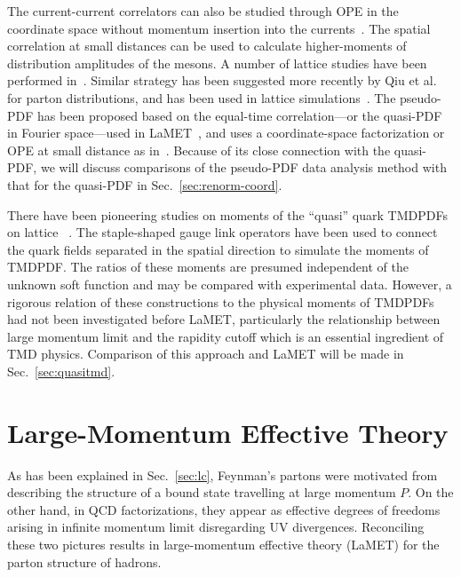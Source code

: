 \documentclass[aps,rmp,reprint,amsmath,amssymb,graphicx,longbibliography]{revtex4-1} %
\DeclareRobustCommand{\sec}[1]{Sec.~\ref{sec:#1}}
\begin{document}
The current-current correlators can also be studied through OPE
in the coordinate space without momentum insertion into the
currents~\cite{Braun:2007wv}. The spatial correlation at small distances
can be used to calculate higher-moments of distribution amplitudes of the mesons.
A number of lattice studies have been performed in~\cite{Braun:2015axa,Bali:2018spj,Bali:2019dqc}.
Similar strategy has been suggested more recently by Qiu et al.~\cite{Ma:2017pxb}
for parton distributions, and has been used in lattice simulations~\cite{Sufian:2019bol,Sufian:2020vzb}.
The pseudo-PDF has been proposed based on the equal-time correlation---or the quasi-PDF in Fourier space---used
in LaMET~\cite{Radyushkin:2017cyf,Radyushkin:2019owq}, and uses a coordinate-space factorization or OPE at small distance
as in~\cite{Braun:2007wv}. Because of its close connection with the quasi-PDF, we
will discuss comparisons of the pseudo-PDF data analysis method with that for the quasi-PDF
in \sec{renorm-coord}.

There have been pioneering studies on moments of the ``quasi'' quark TMDPDFs on lattice ~\cite{Hagler:2009mb,Musch:2010ka,Musch:2011er,Engelhardt:2015xja,Yoon:2017qzo}.
The staple-shaped gauge link operators have been used to connect the quark fields
separated in the spatial direction to simulate the moments of TMDPDF. The ratios of these moments
are presumed independent of the unknown soft function and may be compared with experimental data.
However, a rigorous relation of these constructions to the physical moments of TMDPDFs
had not been investigated before LaMET, particularly the relationship between
large momentum limit and the rapidity cutoff which is an essential ingredient of
TMD physics. Comparison of this approach and LaMET will be made in \sec{quasitmd}.
\section{Large-Momentum Effective Theory}
\label{sec:lamet}
As has been explained in \sec{lc}, Feynman's partons
were motivated from describing the structure of a bound state
travelling at large momentum $P$. On the other hand, in QCD
factorizations, they appear as effective degrees of freedoms
arising in infinite momentum limit disregarding UV divergences.
Reconciling these two pictures results in large-momentum
effective theory (LaMET) for the parton structure of hadrons.
\end{document}
